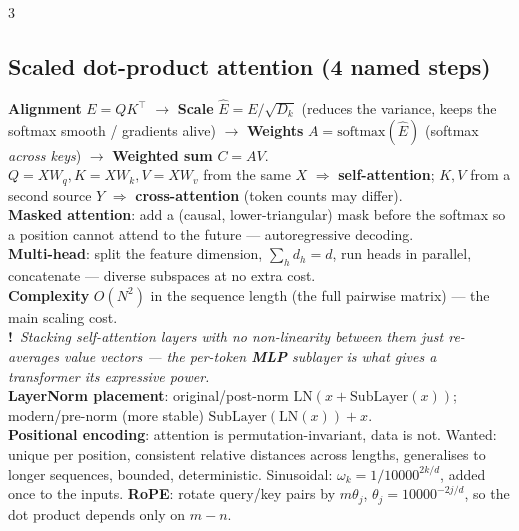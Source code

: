 \documentclass[9pt,a4paper,landscape]{extarticle}
\newcommand{\key}[1]{\textbf{#1}}
\newcommand{\tr}[1]{{\color{trap}\textbf{!}}\ \textit{#1}}
\begin{document}
\begin{multicols}{3}
\subsection{Scaled dot-product attention (4 named steps)}
\key{Alignment} $E=QK^\top$ $\to$ \key{Scale} $\hat E=E/\sqrt{D_k}$ (reduces the variance, keeps the softmax smooth / gradients alive) $\to$ \key{Weights} $A=\mathrm{softmax}(\hat E)$ (softmax \emph{across keys}) $\to$ \key{Weighted sum} $C=AV$.\\
$Q=XW_q,K=XW_k,V=XW_v$ from the same $X$ $\Rightarrow$ \key{self-attention}; $K,V$ from a second source $Y$ $\Rightarrow$ \key{cross-attention} (token counts may differ).\\
\key{Masked attention}: add a (causal, lower-triangular) mask before the softmax so a position cannot attend to the future --- autoregressive decoding.\\
\key{Multi-head}: split the feature dimension, $\sum_h d_h=d$, run heads in parallel, concatenate --- diverse subspaces at no extra cost.\\
\key{Complexity} $O(N^2)$ in the sequence length (the full pairwise matrix) --- the main scaling cost.\\
\tr{Stacking self-attention layers with no non-linearity between them just re-averages value vectors --- the per-token \key{MLP} sublayer is what gives a transformer its expressive power.}\\
\key{LayerNorm placement}: original/post-norm $\mathrm{LN}(x+\mathrm{SubLayer}(x))$; modern/pre-norm (more stable) $\mathrm{SubLayer}(\mathrm{LN}(x))+x$.\\
\key{Positional encoding}: attention is permutation-invariant, data is not. Wanted: unique per position, consistent relative distances across lengths, generalises to longer sequences, bounded, deterministic. Sinusoidal: $\omega_k=1/10000^{2k/d}$, added once to the inputs. \key{RoPE}: rotate query/key pairs by $m\theta_j$, $\theta_j=10000^{-2j/d}$, so the dot product depends only on $m-n$.


\end{multicols}
\end{document}
